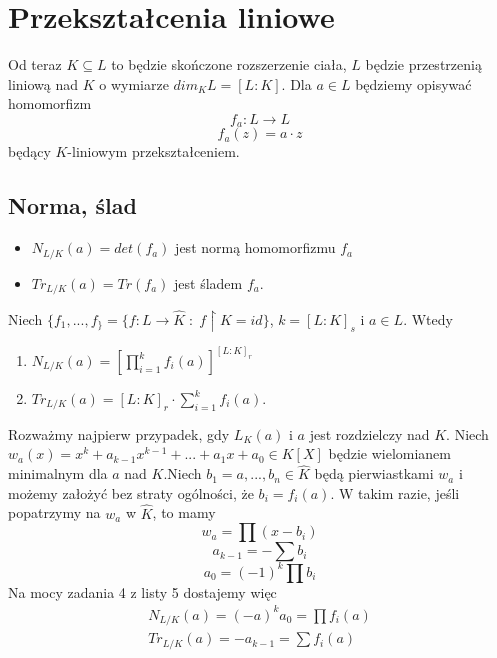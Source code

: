 \section{Przekształcenia liniowe}

Od teraz $K\subseteq L$ to będzie skończone rozszerzenie ciała, $L$ będzie przestrzenią liniową nad $K$ o wymiarze $dim_KL=[L:K]$. Dla $a\in L$ będziemy opisywać homomorfizm
$$f_a:L\to L$$
$$f_a(z)=a\cdot z$$
będący $K$-liniowym przekształceniem.

\subsection{Norma, ślad}

\begin{bbox}
\begin{itemize}
    \item[\PHtunny] $N_{L/K}(a)=det(f_a)$ jest normą homomorfizmu $f_a$
    \item[\PHtunny] $Tr_{L/K}(a)=Tr(f_a)$ jest śladem $f_a$.
\end{itemize}
\end{bbox}

\begin{fact}
Niech $\{f_1,...,f_\}=\{f:L\to \hat{K}\;:\;f\restriction K=id\}$, $k=[L:K]_s$ i $a\in L$. Wtedy
\begin{enumerate}
    \item $N_{L/K}(a)=\left[\prod\limits_{i=1}^kf_i(a)\right]^{[L:K]_r}$
    \item $Tr_{L/K}(a)=[L:K]_r\cdot\sum\limits_{i=1}^kf_i(a)$.
\end{enumerate}
\end{fact}
    Rozważmy najpierw przypadek, gdy $L_K(a)$ i $a$ jest rozdzielczy nad $K$. Niech $w_a(x)=x^k+a_{k-1}x^{k-1}+...+a_1x+a_0\in K[X]$ będzie wielomianem minimalnym dla $a$ nad $K$.Niech $b_1=a,...,b_n\in\hat{K}$ będą pierwiastkami $w_a$ i możemy założyć bez straty ogólności, że $b_i=f_i(a)$. W takim razie, jeśli popatrzymy na $w_a$ w $\hat{K}$, to mamy
    $$w_a=\prod(x-b_i)$$
    $$a_{k-1}=-\sum b_i$$
    $$a_0=(-1)^k\prod b_i$$
    Na mocy zadania 4 z listy 5 dostajemy więc
    $$\begin{array}{l}
        N_{L/K}(a)=(-a)^ka_0=\prod f_i(a)\\
        Tr_{L/K}(a)=-a_{k-1}=\sum f_i(a)
    \end{array}$$

